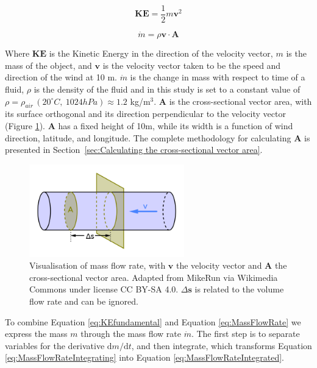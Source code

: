     \begin{equation}
    \label{eq:KEfundamental}
        \mathbf{KE} = \frac{1}{2} m\mathbf{v}^2
    \end{equation}

    \begin{equation}
    \label{eq:MassFlowRate}
        \dot{m} = \rho \mathbf{v} \cdot \mathbf{A}
    \end{equation}

    Where $\mathbf{KE}$ is the Kinetic Energy in the direction of the velocity vector, $m$ is the mass of the object, and $\mathbf{v}$ is the velocity vector taken to be the speed and direction of the wind at 10 m. $\dot{m}$ is the change in mass with respect to time of a fluid, $\rho$ is the density of the fluid and in this study is set to a constant value of $\rho = \rho_{air}\, \left(20^{\circ}C,\: 1024hPa\right) \approx 1.2$ kg/m$^3$. $\mathbf{A}$ is the cross-sectional vector area, with its surface orthogonal and its direction perpendicular to the velocity vector (Figure \ref{fig:volumeflowrate}). $\mathbf{A}$ has a fixed height of 10m, while its width is a function of wind direction, latitude, and longitude. The complete methodology for calculating $\mathbf{A}$ is presented in Section~\ref{sec:Calculating the cross-sectional vector area}. 

    \begin{figure}
        \centering
        \includegraphics[width=0.6\textwidth]{figures/640px-Volumetric-flow-rate.svg.png}
        \caption{Visualisation of mass flow rate, with $\mathbf{v}$ the velocity vector and $\mathbf{A}$ the cross-sectional vector area. Adapted from MikeRun via Wikimedia Commons under license CC BY-SA 4.0. $\Delta \mathbf{s}$ is related to the volume flow rate and can be ignored.}
        \label{fig:volumeflowrate}
    \end{figure}
    
    To combine Equation \ref{eq:KEfundamental} and Equation \ref{eq:MassFlowRate} we express the mass $m$ through the mass flow rate $\dot{m}$. The first step is to separate variables for the derivative $\mathrm{d}m/\mathrm{d}t$, and then integrate, which transforms Equation \ref{eq:MassFlowRateIntegrating} into Equation \ref{eq:MassFlowRateIntegrated}.
    
